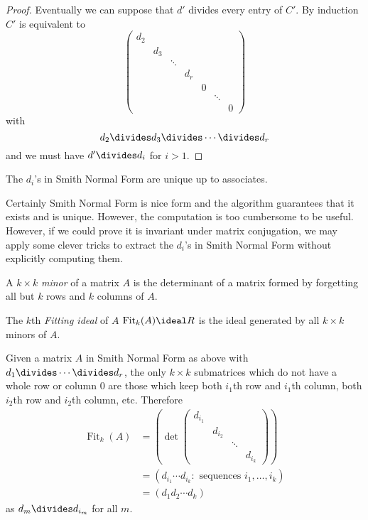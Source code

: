 \documentclass[a4paper]{article}
\DeclareMathOperator{\fit}{Fit}
\begin{document}
\begin{proof}
  Eventually we can suppose that \(d'\) divides every entry of \(C'\). By induction \(C'\) is equivalent to
  \[
    \begin{pmatrix}
      d_2 \\
      & d_3 \\
      & & \ddots \\
      & & & d_r \\
      & & & & 0 \\
      & & & & & \ddots \\
      & & & & & & 0
    \end{pmatrix}
  \]
  with
  \[
    d_2 \divides d_3 \divides \cdots \divides d_r
  \]
  and we must have \(d' \divides d_i\) for \(i > 1\).
\end{proof}

\begin{remark}
  The \(d_i\)'s in Smith Normal Form are unique up to associates.
\end{remark}

Certainly Smith Normal Form is nice form and the algorithm guarantees that it exists and is unique. However, the computation is too cumbersome to be useful. However, if we could prove it is invariant under matrix conjugation, we may apply some clever tricks to extract the \(d_i\)'s in Smith Normal Form without explicitly computing them.

\begin{definition}[Minor]
  A \(k \times k\) \emph{minor} of a matrix \(A\) is the determinant of a matrix formed by forgetting all but \(k\) rows and \(k\) columns of \(A\).
\end{definition}

\begin{definition}
  The \(k\)th \emph{Fitting ideal} of \(A\) \(\fit_k(A) \ideal R\) is the ideal generated by all \(k \times k\) minors of \(A\).
\end{definition}

Given a matrix \(A\) in Smith Normal Form as above with \(d_1 \divides \cdots \divides d_r\), the only \(k \times k\) submatrices which do not have a whole row or column \(0\) are those which keep both \(i_1\)th row and \(i_1\)th column, both \(i_2\)th row and \(i_2\)th column, etc. Therefore
\begin{align*}
  \fit_k(A) &= \left(\det
    \begin{pmatrix}
      d_{i_1} \\
      & d_{i_2} \\
      & & \ddots \\
      & & & d_{i_k}
    \end{pmatrix}
  \right) \\
            &= (d_{i_1} \cdots d_{i_k}: \text{ sequences } i_1, \dots, i_k) \\
            &= (d_1d_2 \cdots d_k)
\end{align*}
as \(d_m \divides d_{i_m}\) for all \(m\).
\end{document}
